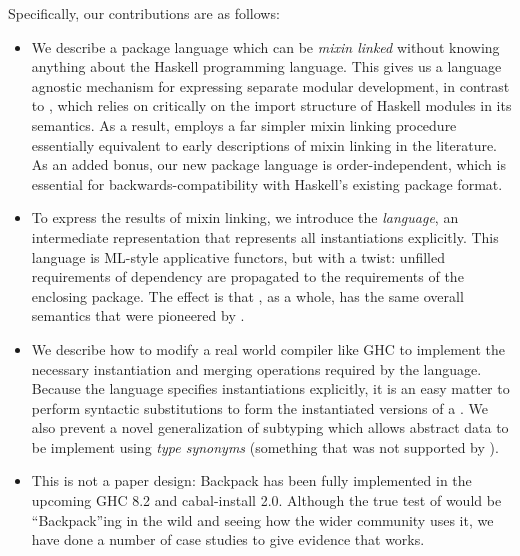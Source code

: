 Specifically, our contributions are as follows:
\begin{itemize}

    \item We describe a package language which can be \emph{mixin
    linked} without knowing anything about the Haskell programming
    language.  This gives us a language agnostic mechanism for
    expressing separate modular development, in contrast to
    \OldBackpack{}, which relies on critically on the import structure
    of Haskell modules in its semantics.  As a result, \Backpack{}
    employs a far simpler mixin linking procedure essentially equivalent
    to early descriptions of mixin linking in the literature.  As an
    added bonus, our new package language is order-independent, which is
    essential for backwards-compatibility with Haskell's existing
    package format.

    \item To express the results of mixin linking, we introduce the
    \emph{\unit{} language}, an intermediate representation that
    represents all instantiations explicitly.  This language is
    ML-style applicative functors, but with a twist:
    unfilled requirements of dependency are propagated to the requirements
    of the enclosing package.  The effect is that \Backpack{}, as a
    whole, has the same overall semantics that were pioneered by \OldBackpack{}.

    \item We describe how to modify a real world compiler like GHC to
    implement the necessary instantiation and merging operations
    required by the \unit{} language.  Because the \unit{} language
    specifies instantiations explicitly, it is an easy matter to perform
    syntactic substitutions to form the instantiated versions of a
    \unit{}.  We also prevent a novel generalization of subtyping
    which allows abstract data to be implement using \emph{type
    synonyms} (something that was not supported by \OldBackpack{}).


    \item This is not a paper design: Backpack has been fully
    implemented in the upcoming GHC 8.2 and cabal-install 2.0.  Although
    the true test of \Backpack{} would be
    ``Backpack''ing in the wild and seeing how the wider community
    uses it, we have done a number of case studies to give evidence
    that \Backpack{} works.


\end{itemize}
